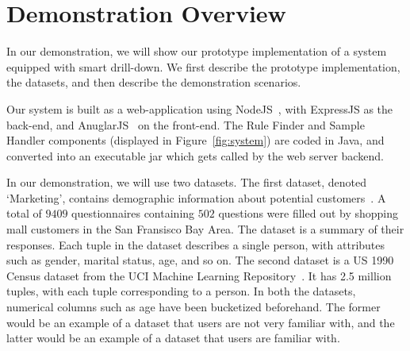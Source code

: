 
\section{Demonstration Overview} \label{sec:demo} 
In our demonstration, we will show our prototype implementation of a system equipped with smart drill-down. We first describe the prototype implementation, the datasets, and then describe the demonstration scenarios.

 Our system is built as a web-application using NodeJS~\cite{Surhone:2010:NOD:1941165}, with ExpressJS as the back-end, and AnuglarJS~\cite{Green:2013:ANG:2663412} on the front-end. The Rule Finder and Sample Handler components (displayed in Figure~\ref{fig:system}) are coded in Java, and converted into an executable jar which gets called by the web server backend. 

 In our demonstration, we will use two datasets. The first dataset, denoted `Marketing', contains demographic information about potential customers~\cite{dataset1}. A total of $9409$ questionnaires containing $502$ questions were filled out by shopping mall customers in the San Fransisco Bay Area. The dataset is a summary of their responses. Each tuple in the dataset describes a single person, with attributes such as gender, marital status, age, and so on. The second dataset is a US 1990 Census dataset from the UCI Machine Learning Repository~\cite{uciml}. It has 2.5 million tuples, with each tuple corresponding to a person. In both the datasets, numerical columns such as age have been bucketized beforehand. The former would be an example of a dataset that users are not very familiar with, and the latter would be an example of a dataset that users are familiar with.


